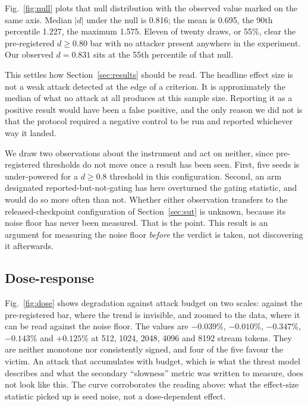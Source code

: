 

Fig.~\ref{fig:null} plots that null distribution with the observed value marked
on the same axis. Median $|d|$ under the null is 0.816; the mean is
0.695, the 90th percentile 1.227, the maximum 1.575. Eleven of twenty
draws, or 55\%, clear the pre-registered $d \geq 0.80$ bar with no attacker
present anywhere in the experiment. Our observed $d = 0.831$ sits at the
55th percentile of that null.

This settles how Section~\ref{sec:results} should be read. The headline effect
size is not a weak attack detected at the edge of a criterion. It is
approximately the median of what no attack at all produces at this sample size.
Reporting it as a positive result would have been a false positive, and the only
reason we did not is that the protocol required a negative control to be run and
reported whichever way it landed.

We draw two observations about the instrument and act on neither, since
pre-registered thresholds do not move once a result has been seen. First, five
seeds is under-powered for a $d \geq 0.8$ threshold in this configuration.
Second, an arm designated reported-but-not-gating has here overturned the gating
statistic, and would do so more often than not. Whether either observation
transfers to the released-checkpoint configuration of Section~\ref{sec:sut} is
unknown, because its noise floor has never
been measured. That is the point. This result is an argument for measuring the
noise floor \emph{before} the verdict is taken, not discovering it afterwards.

\subsection{Dose-response}



Fig.~\ref{fig:dose} shows degradation against attack budget on two scales:
against the pre-registered bar, where the trend is invisible, and zoomed to the
data, where it can be read against the noise floor. The values are $-0.039\%$,
$-0.010\%$, $-0.347\%$, $-0.143\%$ and $+0.125\%$ at 512, 1024, 2048, 4096 and
8192 stream tokens. They are neither monotone nor consistently signed, and four
of the five favour the victim. An attack that accumulates with budget, which is
what the threat model describes and what the secondary ``slowness'' metric was
written to measure, does not look like this. The curve corroborates the reading
above: what the effect-size statistic picked up is seed noise, not a
dose-dependent effect.

